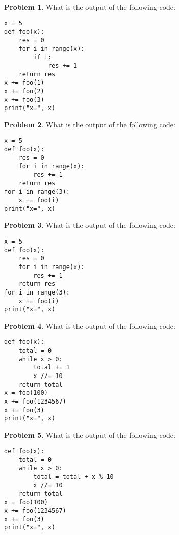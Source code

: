 \documentclass[10pt]{article}
\theoremstyle{definition}
\newtheorem{problem}{Problem}
\begin{document}
\newpage
\begin{problem}
    What is the output of the following code:
\end{problem}
\begin{lstlisting}
x = 5
def foo(x):
    res = 0
    for i in range(x):
        if i:
            res += 1
    return res
x += foo(1)
x += foo(2)
x += foo(3)
print("x=", x)
\end{lstlisting}
\vspace{2in}


\begin{problem}
    What is the output of the following code:
\end{problem}
\begin{lstlisting}
x = 5
def foo(x):
    res = 0
    for i in range(x):
        res += 1
    return res
for i in range(3):
    x += foo(i)
print("x=", x)
\end{lstlisting}
\vspace{2in}


\newpage
\begin{problem}
    What is the output of the following code:
\end{problem}
\begin{lstlisting}
x = 5
def foo(x):
    res = 0
    for i in range(x):
        res += 1
    return res
for i in range(3):
    x += foo(i)
print("x=", x)
\end{lstlisting}
\vspace{2in}


\begin{problem}
    What is the output of the following code:
\end{problem}
\begin{lstlisting}
def foo(x):
    total = 0
    while x > 0:
        total += 1
        x //= 10
    return total
x = foo(100)
x += foo(1234567)
x += foo(3)
print("x=", x)
\end{lstlisting}
\vspace{2in}

\newpage
\begin{problem}
    What is the output of the following code:
\end{problem}
\begin{lstlisting}
def foo(x):
    total = 0
    while x > 0:
        total = total + x % 10
        x //= 10
    return total
x = foo(100)
x += foo(1234567)
x += foo(3)
print("x=", x)
\end{lstlisting}
\vspace{2in}
\end{document}
